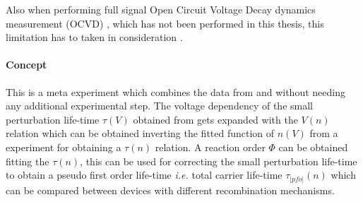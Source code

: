 Also when performing full signal Open Circuit Voltage Decay dynamics measurement (OCVD) \cite{Lederhandler1955,Mahan1981}, which has not been performed in this thesis, this limitation has to taken in consideration \cite{Tvingstedt2017,Pockett2017,Pockett2015,Kiermasch2018}.

\label{tpvce}

\paragraph{Concept}
This is a meta experiment which combines the data from  and  without needing any additional experimental step.
The voltage dependency of the small perturbation life-time $\tau(V)$ obtained from  gets expanded with the $V(n)$ relation which can be obtained inverting the fitted function of $n(V)$ from a  experiment for obtaining a $\tau(n)$ relation.
A reaction order $\Phi$ can be obtained fitting the $\tau(n)$, this can be used for correcting the small perturbation life-time to obtain a pseudo first order life-time \textit{i.e.} total carrier life-time $\tau_|pfo|(n)$ which can be compared between devices with different recombination mechanisms.

